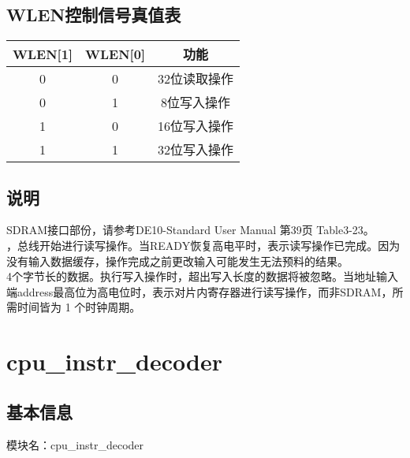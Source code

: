 \subsection{WLEN控制信号真值表}
\begin{tabular}{|c|c|c|}
    \hline
    WLEN[1]  &  WLEN[0] &       功能\\\hline
    0       &   0       &       32位读取操作\\\hline
    0       &   1       &       8位写入操作\\\hline
    1       &   0       &       16位写入操作\\\hline
    1       &   1       &       32位写入操作\\\hline
\end{tabular}
\subsection{说明}
SDRAM接口部份，请参考DE10-Standard User Manual 第39页 Table3-23。\\
，总线开始进行读写操作。当READY恢复高电平时，表示读写操作已完成。因为没有输入数据缓存，操作完成之前更改输入可能发生无法预料的结果。\\
4个字节长的数据。执行写入操作时，超出写入长度的数据将被忽略。当地址输入端address最高位为高电位时，表示对片内寄存器进行读写操作，而非SDRAM，所需时间皆为 1 个时钟周期。

\section{cpu\_instr\_decoder}
\subsection{基本信息}
模块名：cpu\_instr\_decoder
